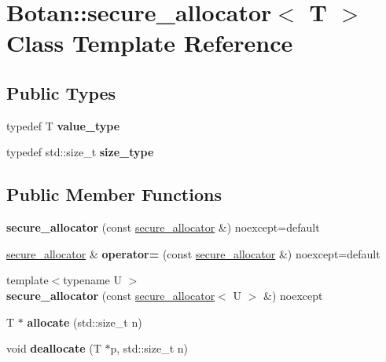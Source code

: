 \hypertarget{class_botan_1_1secure__allocator}{}\section{Botan\+:\+:secure\+\_\+allocator$<$ T $>$ Class Template Reference}
\label{class_botan_1_1secure__allocator}
\subsection*{Public Types}
\begin{DoxyCompactItemize}
\item 
\mbox{\label{class_botan_1_1secure__allocator_a8ca8013fa95cc954cb9ce6a2f9b92be6}} 
typedef T {\bfseries value\+\_\+type}
\item 
\mbox{\label{class_botan_1_1secure__allocator_a9ce6d4fd06ca8565f70adf9274a4ccd0}} 
typedef std\+::size\+\_\+t {\bfseries size\+\_\+type}
\end{DoxyCompactItemize}
\subsection*{Public Member Functions}
\begin{DoxyCompactItemize}
\item 
\mbox{\label{class_botan_1_1secure__allocator_a86f8294a67b0587b2377379b25c4d165}} 
{\bfseries secure\+\_\+allocator} (const \mbox{\hyperlink{class_botan_1_1secure__allocator}{secure\+\_\+allocator}} \&) noexcept=default
\item 
\mbox{\label{class_botan_1_1secure__allocator_a15fd1dbcb0ddd6640783ebf71286d069}} 
\mbox{\hyperlink{class_botan_1_1secure__allocator}{secure\+\_\+allocator}} \& {\bfseries operator=} (const \mbox{\hyperlink{class_botan_1_1secure__allocator}{secure\+\_\+allocator}} \&) noexcept=default
\item 
\mbox{\label{class_botan_1_1secure__allocator_a6dc4218b164bdc88705b1f7fbfd01000}} 
{\footnotesize template$<$typename U $>$ }\\{\bfseries secure\+\_\+allocator} (const \mbox{\hyperlink{class_botan_1_1secure__allocator}{secure\+\_\+allocator}}$<$ U $>$ \&) noexcept
\item 
\mbox{\label{class_botan_1_1secure__allocator_af45defc71c1d292185e0bb6cc281a995}} 
T $\ast$ {\bfseries allocate} (std\+::size\+\_\+t n)
\item 
\mbox{\label{class_botan_1_1secure__allocator_a229c70a58ce7bf5c4a0fec703314324a}} 
void {\bfseries deallocate} (T $\ast$p, std\+::size\+\_\+t n)
\end{DoxyCompactItemize}


